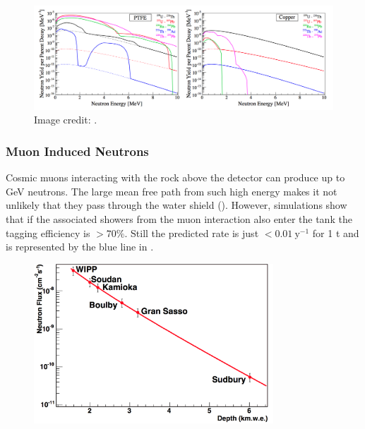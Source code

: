 \begin{figure}
\centering
\includegraphics[width=\textwidth]{NeutronYields}
\caption{Image credit: .}
\label{fig:backgrounds_nuclear_radiogenic_rates}
\end{figure}



\subsubsection{Muon Induced Neutrons}
\label{subsubsec:backgrounds_nuclear_muon_induced}
Cosmic muons interacting with the rock above the detector can produce up to GeV neutrons.  The large mean free path from such high energy
makes it not unlikely that they pass through the water shield ().  However, simulations show that if
the associated showers from the muon interaction also enter the tank the tagging efficiency is $> 70\%$.  Still the predicted rate is just
$< 0.01\ \mathrm{y^{-1}}$ for 1 t and is represented by the blue line in .

\begin{figure}
\centering
\includegraphics[width=0.8\textwidth]{MuonFluxOverDepth}
\label{fig:backgrounds_nuclear_muon_induced_flux}
\end{figure}


